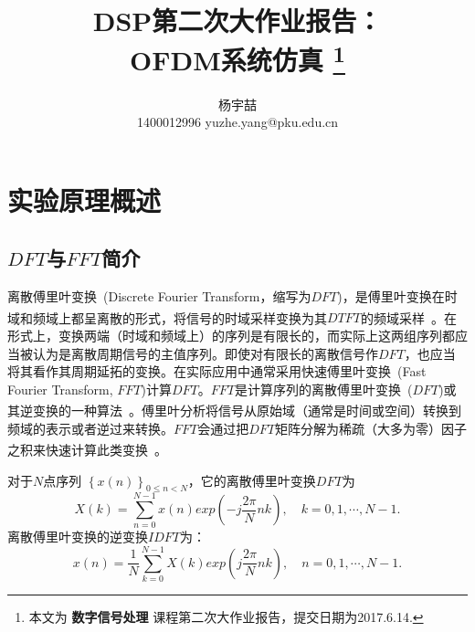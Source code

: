 \documentclass[a4paper,11pt,onecolumn,twoside]{article}
\title{\huge{DSP第二次大作业报告：\\OFDM系统仿真}
\thanks{本文为 \textbf{数字信号处理} 课程第二次大作业报告，提交日期为2017.6.14.}}
\author{杨宇喆 \\[2pt]
\normalsize
1400012996 \qquad yuzhe.yang@pku.edu.cn
\\[2pt]}
\date{}  %
\begin{document}
\newcommand{\supercite}[1]{\textsuperscript{\cite{#1}}}

\maketitle

\setlength{\oddsidemargin}{-.5cm}  %
\setlength{\evensidemargin}{\oddsidemargin}
\setlength{\textwidth}{17.00cm}

\section{实验原理概述}

\subsection{$DFT$与$FFT$简介}
离散傅里叶变换~(Discrete Fourier Transform，缩写为$DFT$)，是傅里叶变换在时域和频域上都呈离散的形式，将信号的时域采样变换为其$DTFT$的频域采样~\supercite{wiki}。在形式上，变换两端（时域和频域上）的序列是有限长的，而实际上这两组序列都应当被认为是离散周期信号的主值序列。即使对有限长的离散信号作$DFT$，也应当将其看作其周期延拓的变换。在实际应用中通常采用快速傅里叶变换~(Fast Fourier Transform, $FFT$)计算$DFT$。$FFT$是计算序列的离散傅里叶变换~($DFT$)或其逆变换的一种算法~\supercite{wiki}。傅里叶分析将信号从原始域（通常是时间或空间）转换到频域的表示或者逆过来转换。$FFT$会通过把$DFT$矩阵分解为稀疏（大多为零）因子之积来快速计算此类变换~\supercite{wikifft}。

对于$N$点序列 $\left\{x(n)\right\}_{0\leq n<N}$，它的离散傅里叶变换$DFT$为
\begin{equation}
X(k) = \sum_{n=0}^{N-1} x(n) exp(-j\frac{2\pi}{N} nk), \quad k = 0,1,\cdots,N-1.
\end{equation}
离散傅里叶变换的逆变换$IDFT$为：
\begin{equation}
x(n) = \frac{1}{N} \sum_{k=0}^{N-1} X(k) exp(j\frac{2\pi}{N} nk), \quad n = 0,1,\cdots,N-1.
\end{equation}
\end{document}
